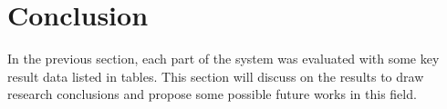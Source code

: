 \chapter{Conclusion}
\label{chap:Conclusion}
In the previous section, each part of the system was evaluated with some key result data listed in tables.
This section will discuss on the results to draw research conclusions and propose some possible future works in this field.


